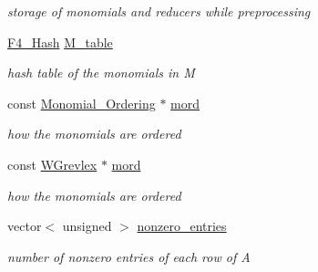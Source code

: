 \begin{DoxyCompactItemize}
\begin{DoxyCompactList}\small\item\em storage of monomials and reducers while preprocessing \end{DoxyCompactList}\item 
\mbox{\label{group___g_b_computation_ae0a76700237de2f2e4340f4f1a78c7ff}} 
\hyperlink{group___g_b_computation_class_f4___hash}{F4\+\_\+\+Hash} \hyperlink{group___g_b_computation_ae0a76700237de2f2e4340f4f1a78c7ff}{M\+\_\+table}
\begin{DoxyCompactList}\small\item\em hash table of the monomials in {\ttfamily M} \end{DoxyCompactList}\item 
\mbox{\label{group___g_b_computation_a4f684766174bbefa4d04df3fa894ad1d}} 
const \hyperlink{group__orderinggroup_class_monomial___ordering}{Monomial\+\_\+\+Ordering} $\ast$ \hyperlink{group___g_b_computation_a4f684766174bbefa4d04df3fa894ad1d}{mord}
\begin{DoxyCompactList}\small\item\em how the monomials are ordered \end{DoxyCompactList}\item 
\mbox{\label{group___g_b_computation_a9b23364eb687aaa5c09882f59be4033c}} 
const \hyperlink{group__orderinggroup_class_w_grevlex}{W\+Grevlex} $\ast$ \hyperlink{group___g_b_computation_a9b23364eb687aaa5c09882f59be4033c}{mord}
\begin{DoxyCompactList}\small\item\em how the monomials are ordered \end{DoxyCompactList}\item 
\mbox{\label{group___g_b_computation_a55db3cd23309e08acfbce3b6d2feec85}} 
vector$<$ unsigned $>$ \hyperlink{group___g_b_computation_a55db3cd23309e08acfbce3b6d2feec85}{nonzero\+\_\+entries}
\begin{DoxyCompactList}\small\item\em number of nonzero entries of each row of A \end{DoxyCompactList}\item 
\mbox{\label{group___g_b_computation_a89273e870d32497bb2a45fb74461194e}} 

\end{DoxyCompactItemize}
